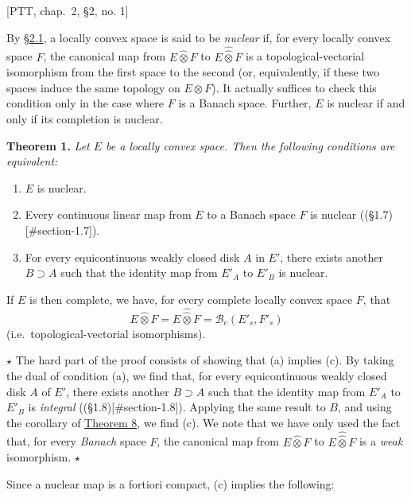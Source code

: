 \documentclass[british]{article}
\newenvironment{itenv}[1]
  {\phantomsection\par\smallskip\noindent\textbf{#1.}\itshape}
  {\par\smallskip}
\newcommand{\oldpage}[1]{\marginpar{\footnotesize$\Big\vert$ \textit{p.~#1}}}
\begin{document}
{[}PTT, chap.~2, §2, no. 1{]}

By \hyperref[section-2.1]{§2.1}, a locally convex space is said to be
\emph{nuclear} if, for every locally convex space \(F\), the canonical
map from \(E\hat{\otimes}F\) to \(E\hat{\hat{\otimes}}F\) is a
topological-vectorial isomorphism from the first space to the second
(or, equivalently, if these two spaces induce the same topology on
\(E\otimes F\)). It actually suffices to check this condition only in
the case where \(F\) is a Banach space. Further, \(E\) is nuclear if and
only if its completion is nuclear.

\protect{}\label{section-2-theorem-1}
\begin{itenv}{Theorem 1}
Let \(E\) be a locally convex space. Then the following conditions are
equivalent:

\begin{enumerate}
\def\labelenumi{\alph{enumi}.}
\item
  \(E\) is nuclear.
\item
  Every continuous linear map from \(E\) to a Banach space \(F\) is
  nuclear ((§1.7){[}\#section-1.7{]}).
\item
  For every equicontinuous weakly closed disk \(A\) in \(E'\), there
  exists another \(B\supset A\) such that the identity map from \(E'_A\)
  to \(E'_B\) is nuclear.
\end{enumerate}

If \(E\) is then complete, we have, for every complete locally convex
space \(F\), that \[
  E\hat{\otimes}F = E\hat{\hat{\otimes}}F = \mathscr{B}_e(E'_s,F'_s)
\] (i.e.~topological-vectorial isomorphisms).

\end{itenv}

\(\star\) The hard part of the proof consists of showing that (a)
implies (c). By taking the dual of condition (a), we find that, for
every equicontinuous weakly closed disk \(A\) of \(E'\), there exists
another \(B\supset A\) such that the identity map from \(E'_A\) to
\(E'_B\) is \emph{integral} ((§1.8){[}\#section-1.8{]}). Applying the
same result to \(B\), and using the corollary of
\hyperref[section-1-theorem-8]{Theorem 8}, we find (c). We note that we
have only used the fact that, for every \emph{Banach} space \(F\), the
canonical map from \(E\hat{\otimes}F\) to \(E\hat{\hat{\otimes}}F\) is a
\emph{weak} isomorphism. \(\star\)

\oldpage{101}

Since a nuclear map is a fortiori compact, (c) implies the following:
\end{document}
